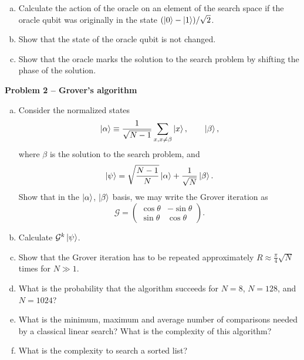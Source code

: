 \documentclass[a4paper,10pt]{article}
\newcommand{\Problem}[1]{
  {
  \vspace*{0.5cm}
  \textsf{\textbf{Problem #1}}
  \vspace*{0.2cm}
  
  }
}
\begin{document}
\begin{enumerate}[a)]
\item Calculate the action of the oracle on an element of the search space if
the oracle qubit was originally in the state $(\ket{0}-\ket{1})/\sqrt{2}$.
\item Show that the state of the oracle qubit is not changed.
\item Show that the oracle marks the solution to the search problem by shifting
the phase of the solution.
\end{enumerate}

\Problem{2 -- Grover's algorithm}

\begin{enumerate}[a)]
\item Consider the normalized states
\begin{equation}
\ket{\alpha} \equiv \frac{1}{\sqrt{N-1}} \sum_{x,x\ne \beta} \ket{x}, \qquad \ket{\beta},
\end{equation}
where $\beta$ is the solution to the search problem, and
\begin{equation}
\ket{\psi} = \sqrt{\frac{N-1}{N}} \ket{\alpha} + \frac{1}{\sqrt{N}} \ket{\beta}.
\end{equation}
Show that in the
$\ket{\alpha}$, $\ket{\beta}$ basis, we may write the Grover iteration as
\begin{equation}
\mathcal{G}= \left(\begin{array}{cc}
\cos\theta & -\sin\theta \\
\sin\theta &  \cos\theta
\end{array}\right).
\end{equation}
\item Calculate $\mathcal{G}^k\ket{\psi}$.
\item Show that the Grover iteration has to be repeated approximately $R\approx\frac{\pi}{4}\sqrt{N}$ times for $N \gg 1$.
\item What is the probability that the algorithm succeeds for $N=8$, $N=128$, and
$N=1024$?
\item What is the minimum, maximum and average number of comparisons needed by
a classical linear search? What is the complexity of this algorithm?
\item What is the complexity to search a sorted list?
\end{enumerate}
\end{document}
